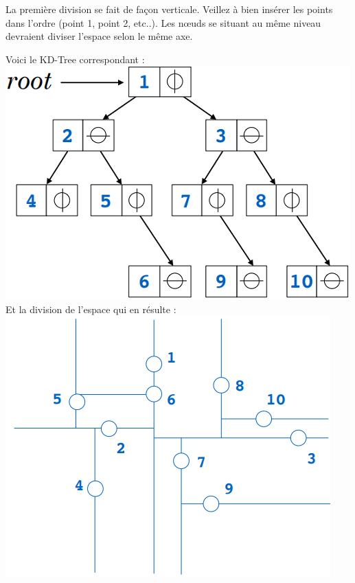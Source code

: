 \begin{Exercice}[5 minutes]
\begin{conseil}
La première division se fait de façon verticale. Veillez à bien insérer les points dans l'ordre (point 1, point 2, etc..). Les nœuds se situant au même niveau devraient diviser l'espace selon le même axe.
\end{conseil}
\begin{solution}
    Voici le KD-Tree correspondant :\\
    \includegraphics[]{Ressources/Kd-tree.PNG}\\
    Et la division de l'espace qui en résulte :\\
    \includegraphics[]{Ressources/Division espace.PNG}
\end{solution}
\end{Exercice}

